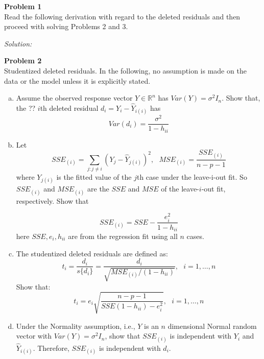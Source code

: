 \documentclass{article}
\newenvironment{problem}[2][Problem]
    { \begin{mdframed}[backgroundcolor=gray!20] \textbf{#1 #2} \\}
    {  \end{mdframed}}
\newenvironment{solution}
    {\textit{Solution:}}
    {}
\begin{document}
\begin{problem}{1}
Read the following derivation with regard to the deleted residuals and then proceed with solving Problems 2 and 3.
\end{problem}
\begin{solution}
\end{solution}

\begin{problem}{2}
 Studentized deleted residuals. In the following, no assumption is made on the data or the model unless it is explicitly stated.
\begin{enumerate}[(a)]
\item Assume the observed response vector $Y \in \mathbb R^n$ has $Var(Y) = \sigma^2 I_n$. Show that, the ??
$i$th deleted residual $d_i = Y_i -  \hat Y_{i(i)}$ has
$$Var(d_i) = \frac{\sigma^2}{1 - h_{ii}}$$
\item Let
$$SSE_{(i)} = \sum_{j : j \not = i} (Y_j - \hat Y_{j(i)})^2, \ \ \ MSE_{(i)} = \frac{SSE_{(i)}}{n - p - 1}$$
where $Y_{j(i)}$ is the fitted value of the $j$th case under the leave-i-out fit. So $SSE_{(i)}$ and
$MSE_{(i)}$ are the $SSE$ and $MSE$ of the leave-$i$-out fit, respectively. Show that

$$SSE_{(i)} = SSE - \frac{e_i^2}{1 - h_{ii}}$$
here $SSE, e_i, h_{ii}$ are from the regression fit using all $n$ cases.
\item The studentized deleted residuals are defined as:
$$t_i = \frac{d_i}{s\{d_i\}} = \frac{d_i}{\sqrt{MSE_{(i)} / (1 - h_{ii})}}, \ \ \ i = 1, \ldots, n$$
Show that:
$$t_i = e_i \sqrt{\frac{n - p - 1}{SSE(1 - h_{ii}) - e_i^2}}, \ \ \ i = 1, \ldots, n$$
\item  Under the Normality assumption, i.e., $Y$ is an $n$ dimensional Normal random vector with $Var(Y) = \sigma^2 I_n$, show that $SSE_{(i)}$ is independent with $Y_i$ and $\hat Y_{i(i)}$. Therefore, $SSE_{(i)}$ is independent with $d_i$.
\end{enumerate}
\end{problem}
\end{document}

